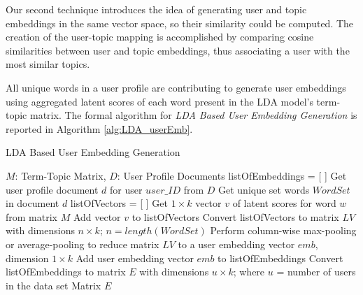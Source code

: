             Our second technique introduces the idea of generating user and topic embeddings in the same vector space, so their similarity could be computed. The creation of the user-topic mapping is accomplished by comparing cosine similarities between user and topic embeddings, thus associating a user with the most similar topics. 
            
            All unique words in a user profile are contributing to generate user embeddings using aggregated latent scores of each word present in the LDA model's term-topic matrix. The formal algorithm for \emph{LDA Based User Embedding Generation} is reported in Algorithm \ref{alg:LDA_userEmb}. 
            
            \begin{algorithm}
                \caption{LDA Based User Embedding Generation}
                \label{alg:LDA_userEmb}
                \begin{algorithmic}[1]
                    \REQUIRE $M$: Term-Topic Matrix, $D$: User Profile Documents 
                    \STATE listOfEmbeddings = [ ]
                        \STATE Get user profile document $d$ for user $user\_ID$ from $D$
                        \STATE Get unique set words $WordSet$ in document $d$
                        \STATE listOfVectors = [ ]
                        \STATE
                            \STATE Get $1 \times k$ vector $v$ of latent scores for word $w$ from matrix $M$
                            \STATE Add vector $v$ to listOfVectors
                        \ENDFOR
                        \STATE Convert listOfVectors to matrix $LV$ with dimensions $n \times k$; $n=length(WordSet)$
                        \STATE Perform column-wise max-pooling or average-pooling to reduce matrix $LV$ to a user embedding vector $emb$, dimension $1 \times k$
                        \STATE Add user embedding vector $emb$ to listOfEmbeddings
                    \ENDFOR
                    \STATE Convert listOfEmbeddings to matrix $E$ with dimensions $u \times k$; where $u$ = number of users in the data set
                    \RETURN Matrix $E$
                \end{algorithmic}
            \end{algorithm}
        
